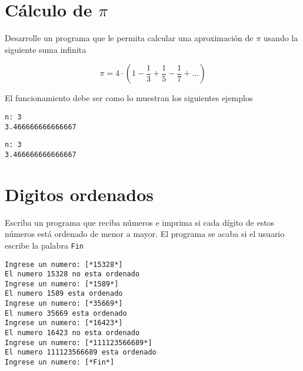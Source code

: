\section*{Cálculo de $\pi$}

Desarrolle un programa que le permita calcular una aproximación de $\pi$ usando la siguiente suma infinita

\begin{equation}
    \pi=4\cdot \left( 1-\frac{1}{3}+\frac{1}{5}-\frac{1}{7} + \ldots \right)
\end{equation}

El funcionamiento debe ser como lo muestran los siguientes ejemplos

\begin{lstlisting}[style=consola]
n: 3
3.466666666666667
\end{lstlisting}

\begin{lstlisting}[style=consola]
n: 3
3.466666666666667
\end{lstlisting}
\pagebreak[4]
\section*{Digitos ordenados}

Escriba un programa que reciba números e imprima si cada dígito de estos números está ordenado de menor a mayor. El programa se acaba si el usuario escribe la palabra \texttt{Fin}

\begin{lstlisting}[style=consola]
Ingrese un numero: [*15328*]
El numero 15328 no esta ordenado
Ingrese un numero: [*1589*]
El numero 1589 esta ordenado
Ingrese un numero: [*35669*]
El numero 35669 esta ordenado
Ingrese un numero: [*16423*]
El numero 16423 no esta ordenado
Ingrese un numero: [*111123566689*]
El numero 111123566689 esta ordenado
Ingrese un numero: [*Fin*]
\end{lstlisting}

